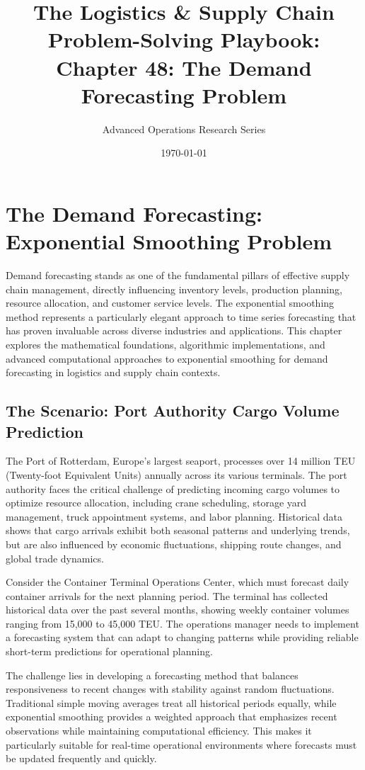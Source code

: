 \documentclass{article}
\title{The Logistics \& Supply Chain Problem-Solving Playbook:\\
Chapter 48: The Demand Forecasting Problem}
\author{Advanced Operations Research Series}
\date{\today}
\begin{document}
\maketitle

\section{The Demand Forecasting: Exponential Smoothing Problem}

Demand forecasting stands as one of the fundamental pillars of effective supply chain management, directly influencing inventory levels, production planning, resource allocation, and customer service levels. The exponential smoothing method represents a particularly elegant approach to time series forecasting that has proven invaluable across diverse industries and applications. This chapter explores the mathematical foundations, algorithmic implementations, and advanced computational approaches to exponential smoothing for demand forecasting in logistics and supply chain contexts.

\subsection{The Scenario: Port Authority Cargo Volume Prediction}

The Port of Rotterdam, Europe's largest seaport, processes over 14 million TEU (Twenty-foot Equivalent Units) annually across its various terminals. The port authority faces the critical challenge of predicting incoming cargo volumes to optimize resource allocation, including crane scheduling, storage yard management, truck appointment systems, and labor planning. Historical data shows that cargo arrivals exhibit both seasonal patterns and underlying trends, but are also influenced by economic fluctuations, shipping route changes, and global trade dynamics.

Consider the Container Terminal Operations Center, which must forecast daily container arrivals for the next planning period. The terminal has collected historical data over the past several months, showing weekly container volumes ranging from 15,000 to 45,000 TEU. The operations manager needs to implement a forecasting system that can adapt to changing patterns while providing reliable short-term predictions for operational planning.

The challenge lies in developing a forecasting method that balances responsiveness to recent changes with stability against random fluctuations. Traditional simple moving averages treat all historical periods equally, while exponential smoothing provides a weighted approach that emphasizes recent observations while maintaining computational efficiency. This makes it particularly suitable for real-time operational environments where forecasts must be updated frequently and quickly.
\end{document}
